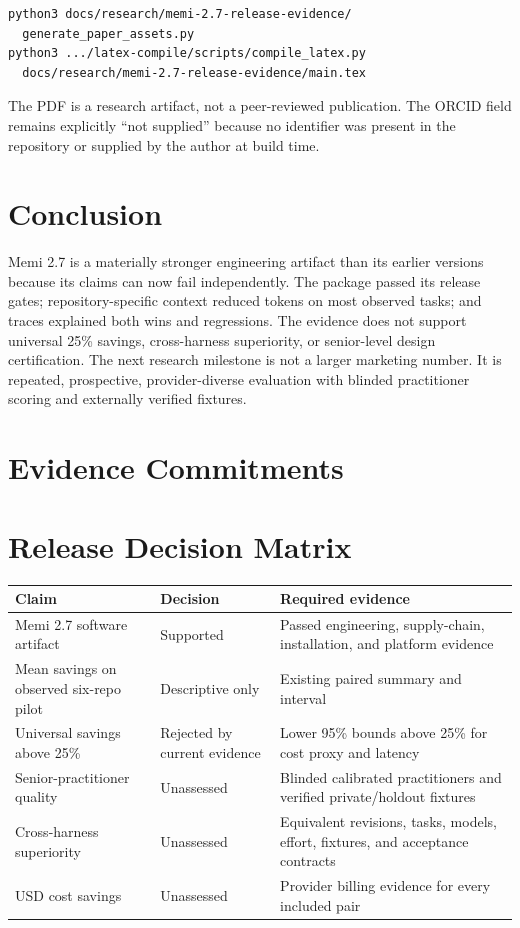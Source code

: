 \documentclass[10pt,twocolumn]{article}
\begin{document}
\begin{lstlisting}
python3 docs/research/memi-2.7-release-evidence/
  generate_paper_assets.py
python3 .../latex-compile/scripts/compile_latex.py
  docs/research/memi-2.7-release-evidence/main.tex
\end{lstlisting}

The PDF is a research artifact, not a peer-reviewed publication. The ORCID
field remains explicitly ``not supplied'' because no identifier was present in
the repository or supplied by the author at build time.

\section{Conclusion}

Memi 2.7 is a materially stronger engineering artifact than its earlier
versions because its claims can now fail independently. The package passed its
release gates; repository-specific context reduced tokens on most observed
tasks; and traces explained both wins and regressions. The evidence does not
support universal 25\% savings, cross-harness superiority, or senior-level
design certification. The next research milestone is not a larger marketing
number. It is repeated, prospective, provider-diverse evaluation with blinded
practitioner scoring and externally verified fixtures.

\balance



\clearpage
\onecolumn
\appendix
\section{Evidence Commitments}
\small


\section{Release Decision Matrix}

\begin{tabularx}{\textwidth}{@{}p{}p{}X@{}}
\toprule
Claim & Decision & Required evidence \\
\midrule
Memi 2.7 software artifact & Supported & Passed engineering, supply-chain,
installation, and platform evidence \\
Mean savings on observed six-repo pilot & Descriptive only & Existing paired
summary and interval \\
Universal savings above 25\% & Rejected by current evidence & Lower 95\%
bounds above 25\% for cost proxy and latency \\
Senior-practitioner quality & Unassessed & Blinded calibrated practitioners
and verified private/holdout fixtures \\
Cross-harness superiority & Unassessed & Equivalent revisions, tasks, models,
effort, fixtures, and acceptance contracts \\
USD cost savings & Unassessed & Provider billing evidence for every included
pair \\
\bottomrule
\end{tabularx}
\end{document}
